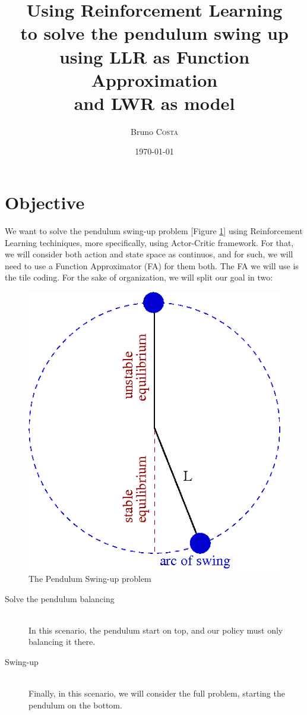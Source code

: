 \documentclass{article}
\title{Using Reinforcement Learning \\ to solve the pendulum swing up \\ using LLR as Function Approximation \\ and LWR as model} %
\author{Bruno \textsc{Costa}} %
\date{\today} %
\begin{document}
\maketitle %



\section{Objective}

We want to solve the pendulum swing-up problem [Figure \ref{fig:swing}] using Reinforcement Learning techiniques, more specifically, using Actor-Critic framework. For that, we will consider both action and state space as continuos, and for such, we will need to use a Function Approximator (FA) for them both. The FA we will use is the tile coding. For the sake of organization, we will split our goal in two:

\begin{figure}[h!]
    \centering
    \includegraphics[width=.4\textwidth]{swing.png}
    \caption{The Pendulum Swing-up problem}
    \label{fig:swing}
\end{figure}

\begin{description}
\item[Solve the pendulum balancing] \hfill \\
In this scenario, the pendulum start on top, and our policy must only balancing it there.
\item[Swing-up] \hfill \\
Finally, in this scenario, we will consider the full problem, starting the pendulum on the bottom.
\end{description}
\end{document}
